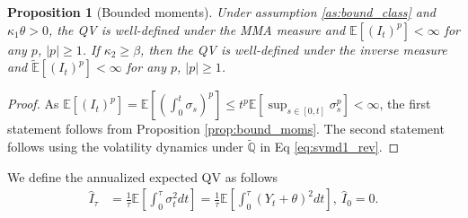 \documentclass[11pt,a4paper] {article}
\newtheorem{proposition}{Proposition}[section]
\begin{document}
\begin{proposition}[Bounded moments]\label{prop:qv_moms}
Under assumption \ref{as:bound_class} and $\kappa_1\theta>0$, the QV is well-defined under the MMA measure and $\mathbb{E}\left[(I_t)^p\right]<\infty$ for any $p$, $|p|\ge 1$. 
If $\kappa_2\ge \beta$, then the QV is well-defined under the inverse measure and $\mathbb{\tilde E}\left[(I_t)^p\right]<\infty$ for any $p$, $|p|\ge 1$. 
\end{proposition} 
\begin{proof}
As $\mathbb{E}[(I_t)^p]=
\mathbb{E}\left[\left(\int_0^t\sigma_s\right)^p\right]\le 
t^p\mathbb{E}\left[\sup_{s\in[0,t]}\sigma_s^p\right]<\infty
$, 
the first statement follows from Proposition \ref{prop:bound_moms}. The second statement follows using the volatility dynamics under $\mathbb{\tilde{Q}}$ in Eq \eqref{eq:svmd1_rev}.
\end{proof}



We define the annualized expected QV as follows
\begin{equation} \label {eq:eqv1}
\begin{split}
\widehat{I}_{\tau}&=\frac{1}{\tau}\mathbb{E}\left[\int^{\tau}_{0}\sigma^{2}_{t}dt\right] = \frac{1}{\tau}\mathbb{E}\left[\int^{\tau}_{0}\left(Y_{t} + \theta\right)^{2}dt\right], \ \widehat{I}_{0}=0. \\
\end{split}
\end{equation}
\end{document}
